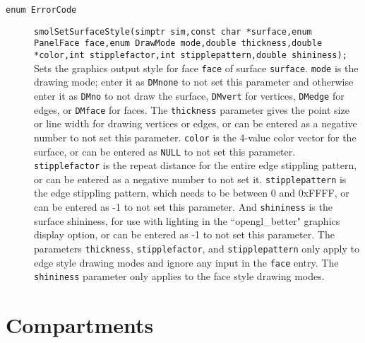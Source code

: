 \documentclass {book}
\begin{document}
\begin{description}
\item[\texttt{enum ErrorCode}]
\texttt{smolSetSurfaceStyle(simptr sim,const char *surface,enum PanelFace face,enum DrawMode mode,double thickness,double *color,int stipplefactor,int stipplepattern,double shininess);}
\hfill \\
Sets the graphics output style for face \texttt{face} of surface \texttt{surface}.  \texttt{mode} is the drawing mode; enter it as \texttt{DMnone} to not set this parameter and otherwise enter it as \texttt{DMno} to not draw the surface, \texttt{DMvert} for vertices, \texttt{DMedge} for edges, or \texttt{DMface} for faces.  The \texttt{thickness} parameter gives the point size or line width for drawing vertices or edges, or can be entered as a negative number to not set this parameter.  \texttt{color} is the 4-value color vector for the surface, or can be entered as \texttt{NULL} to not set this parameter.  \texttt{stipplefactor} is the repeat distance for the entire edge stippling pattern, or can be entered as a negative number to not set it.  \texttt{stipplepattern} is the edge stippling pattern, which needs to be between 0 and 0xFFFF, or can be entered as -1 to not set this parameter.  And \texttt{shininess} is the surface shininess, for use with lighting in the ``opengl\_better" graphics display option, or can be entered as -1 to not set this parameter.  The parameters \texttt{thickness}, \texttt{stipplefactor}, and \texttt{stipplepattern} only apply to edge style drawing modes and ignore any input in the \texttt{face} entry.  The \texttt{shininess} parameter only applies to the face style drawing modes.

\end{description}


\section{Compartments}
\end{document}
